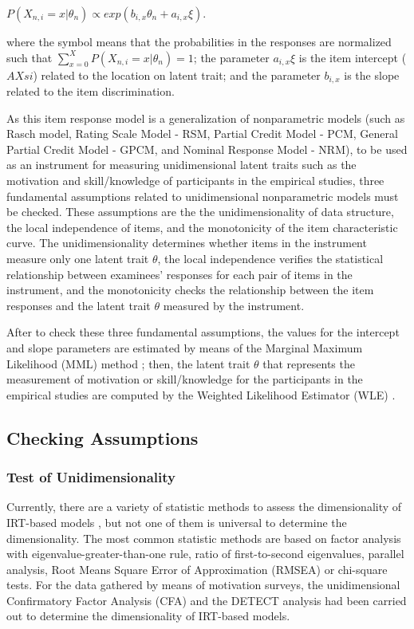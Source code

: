 $P(X_{n,i} = x | \theta_{n}) \propto exp(b_{i,x} \theta_{n} + a_{i,x} \xi)$.

where the symbol \aspas{$\propto$} means that the probabilities in the responses are normalized such that $\sum_{x=0}^{X} P(X_{n,i} = x | \theta_{n}) = 1$; the parameter $a_{i,x} \xi$ is the item intercept ($AXsi$) related to the location on latent trait; and the parameter $b_{i,x}$ is the slope related to the item discrimination.

As this item response model is a generalization of nonparametric models (such as Rasch model, Rating Scale Model - RSM, Partial Credit Model - PCM, General Partial Credit Model - GPCM, and Nominal Response Model - NRM), to be used as an instrument for measuring unidimensional latent traits such as the motivation and skill/knowledge of participants in the empirical studies, three fundamental assumptions related to unidimensional nonparametric models must be checked. These assumptions are the the unidimensionality of data structure, the local independence of items, and the monotonicity of the item characteristic curve. The unidimensionality determines whether items in the instrument measure only one latent trait $\theta$, the local independence verifies the statistical relationship between examinees’ responses for each pair of items in the instrument, and the monotonicity checks the relationship between the item responses and the latent trait $\theta$ measured by the instrument.

After to check these three fundamental assumptions, the values for the intercept and slope parameters are estimated by means of the Marginal Maximum Likelihood (MML) method \cite{BockAitkin1981}; then, the latent trait $\theta$ that represents the measurement of motivation or skill/knowledge for the participants in the empirical studies are computed by the Weighted Likelihood Estimator (WLE) \cite{Warm1989}. 

\subsection{Checking Assumptions}
\label{sec:checking-assumptions-irt-motivation}

\subsubsection*{Test of Unidimensionality}

Currently, there are a variety of statistic methods to assess the dimensionality of IRT-based models \cite{Hattie1985, NandakumarYuLiStout1998}, but not one of them is universal to determine the dimensionality. The most common statistic methods are based on factor analysis with eigenvalue-greater-than-one rule, ratio of first-to-second eigenvalues, parallel analysis, Root Means Square Error of Approximation (RMSEA) or chi-square tests. For the data gathered by means of motivation surveys, the unidimensional Confirmatory Factor Analysis (CFA) \cite{Brown2014} and the DETECT analysis \cite{StoutHabingDouglasKimRoussosZhang1996, Zhang2007} had been carried out to determine the dimensionality of IRT-based models.

